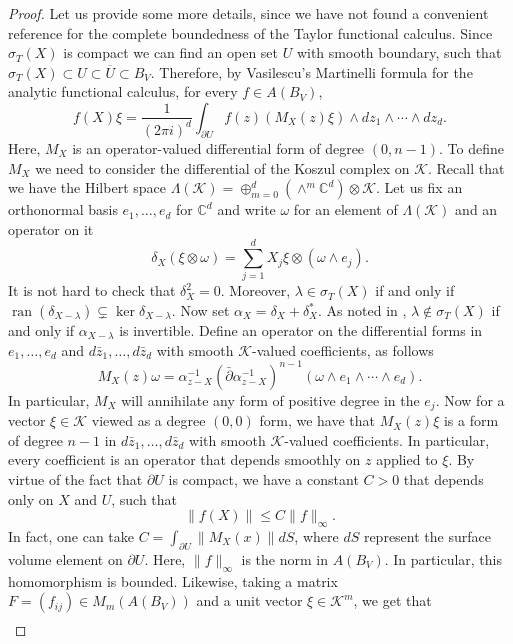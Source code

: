 \documentclass[12pt]{amsart}
\numberwithin{equation}{section}
\theoremstyle{definition}
\newcommand{\cK}{\mathcal{K}}
\newcommand{\C}{\mathbb{C}}
\DeclareMathOperator{\ran}{ran}
\begin{document}
\begin{proof}
    Let us provide some more details, since we have not found a convenient reference for the complete boundedness of the Taylor functional calculus. 
    Since $\sigma_T(X)$ is compact we can find an open set $U$ with smooth boundary, such that $\sigma_T(X) \subset U \subset \overline{U} \subset B_V$. Therefore, by Vasilescu's Martinelli formula for the analytic functional calculus, for every $f \in A(B_V)$,
    \[
    f(X) \xi = \frac{1}{(2\pi i)^d} \int_{\partial U} f(z) (M_X(z) \xi) \wedge dz_1 \wedge \cdots \wedge d z_d.
    \]
    Here, $M_X$ is an operator-valued differential form of degree $(0,n-1)$. To define $M_X$ we need to consider the differential of the Koszul complex on $\cK$. Recall that we have the Hilbert space $\Lambda(\cK) = \oplus_{m=0}^d (\wedge^m \C^d) \otimes \cK$. Let us fix an orthonormal basis $e_1,\ldots, e_d$ for $\C^d$ and write $\omega$ for an element of $\Lambda(\cK)$ and an operator on it
    \[
    \delta_X (\xi \otimes \omega) = \sum_{j=1}^d X_j \xi \otimes (\omega \wedge e_j).
    \]
    It is not hard to check that $\delta_X^2 = 0$. Moreover, $\lambda \in \sigma_T(X)$ if and only if $\ran(\delta_{X - \lambda}) \subsetneq \ker \delta_{X - \lambda}$. Now set $\alpha_X = \delta_X + \delta_X^*$. As noted in \cite{Vasilescu-characterization}, $\lambda \notin \sigma_T(X)$ if and only if $\alpha_{X - \lambda}$ is invertible. Define an operator on the differential forms in $e_1,\ldots,e_d$ and $d\bar{z}_1,\ldots,d\bar{z}_d$ with smooth $\cK$-valued coefficients, as follows
    \[
    M_X(z) \omega= \alpha_{z - X}^{-1} (\bar{\partial} \alpha_{z - X}^{-1})^{n-1} (\omega \wedge e_1 \wedge \cdots \wedge e_d).
    \]
    In particular, $M_X$ will annihilate any form of positive degree in the $e_j$. Now for a vector $\xi \in \cK$ viewed as a degree $(0,0)$ form, we have that $M_X(z) \xi$ is a form of degree $n-1$  in $d\bar{z}_1,\ldots,d\bar{z}_d$ with smooth $\cK$-valued coefficients. In particular, every coefficient is an operator that depends smoothly on $z$ applied to $\xi$. By virtue of the fact that $\partial U$ is compact, we have a constant $C > 0$ that depends only on $X$ and $U$, such that 
    \[
    \|f(X)\| \leq C \|f\|_{\infty}.
    \]
    In fact, one can take $C = \int_{\partial U} \|M_X(x)\| dS$, where $dS$ represent the surface volume element on $\partial U$. 
    Here, $\|f\|_{\infty}$ is the norm in $A(B_V)$. In particular, this homomorphism is bounded. 
    Likewise, taking a matrix $F = (f_{ij}) \in M_m(A(B_V))$ and a unit vector $\xi \in \cK^m$, we get that
    \begin{align*}

\end{align*}
\end{proof}
\end{document}
